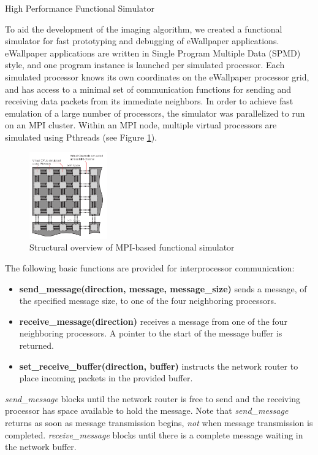 \documentclass[twocolumn]{article}
\makeatletter
\def\section{\@startsection{section}{1}{\z@}{24pt plus 2 pt
minus 2 pt} {12pt plus 2pt minus 2pt}{\large\bf}}
\makeatother
\begin{document}
\section{High Performance Functional Simulator}

To aid the development of the imaging algorithm, we created a functional simulator for fast prototyping and debugging of eWallpaper applications. eWallpaper applications are written in Single Program Multiple Data (SPMD) style, and one program instance is launched per simulated processor. Each simulated processor knows its own coordinates on the eWallpaper processor grid, and has access to a minimal set of communication functions for sending and receiving data packets from its immediate neighbors. In order to achieve fast emulation of a large number of processors, the simulator was parallelized to run on an MPI cluster. Within an MPI node, multiple virtual processors are simulated using Pthreads (see Figure \ref{mpi_sim}).

\begin{figure}[!h]
\centering
\includegraphics*[width=0.3\textwidth]{figures/mpi_sim.pdf}
\caption{Structural overview of MPI-based functional simulator}
\label{mpi_sim}
\end{figure}

The following basic functions are provided for interprocessor communication:
\begin{itemize}
	\item \textbf{send\_message(direction, message, message\_size)} sends a message, of the specified message size, to one of the four neighboring processors.
	\item \textbf{receive\_message(direction)} receives a message from one of the four neighboring processors. A pointer to the start of the message buffer is returned.
	\item \textbf{set\_receive\_buffer(direction, buffer)} instructs the network router to place incoming packets in the provided buffer.
\end{itemize}

{\em send\_message} blocks until the network router is free to send and the receiving processor has space available to hold the message. Note that {\em send\_message} returns as soon as message transmission begins, {\em not} when message transmission is completed. {\em receive\_message} blocks until there is a complete message waiting in the network buffer. 
\end{document}
